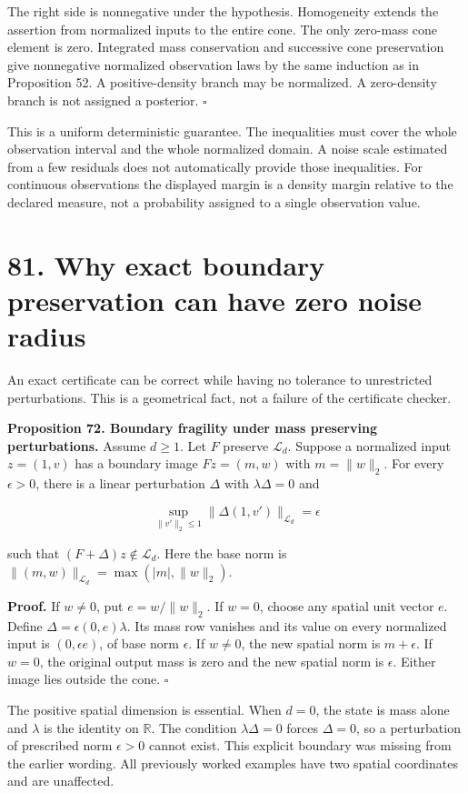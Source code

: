 \documentclass[11pt,letterpaper]{article}
\begin{document}
The right side is nonnegative under the hypothesis. Homogeneity extends
the assertion from normalized inputs to the entire cone. The only
zero-mass cone element is zero. Integrated mass conservation and
successive cone preservation give nonnegative normalized observation
laws by the same induction as in Proposition 52. A positive-density
branch may be normalized. A zero-density branch is not assigned a
posterior. \(\square\)

This is a uniform deterministic guarantee. The inequalities must cover
the whole observation interval and the whole normalized domain. A noise
scale estimated from a few residuals does not automatically provide
those inequalities. For continuous observations the displayed margin is
a density margin relative to the declared measure, not a probability
assigned to a single observation value.

\section{81. Why exact boundary preservation can have zero noise
radius}\label{why-exact-boundary-preservation-can-have-zero-noise-radius}

An exact certificate can be correct while having no tolerance to
unrestricted perturbations. This is a geometrical fact, not a failure of
the certificate checker.

\textbf{Proposition 72. Boundary fragility under mass preserving
perturbations.} Assume \(d\geq1\). Let \(F\) preserve \(\mathcal L_d\).
Suppose a normalized input \(z=(1,v)\) has a boundary image \(Fz=(m,w)\)
with \(m=\|w\|_2\). For every \(\epsilon>0\), there is a linear
perturbation \(\Delta\) with \(\lambda\Delta=0\) and

\[
\sup_{\|v'\|_2\leq1}\|\Delta(1,v')\|_{\mathcal L_d}=\epsilon
\]

such that \((F+\Delta)z\notin\mathcal L_d\). Here the base norm is
\(\|(m,w)\|_{\mathcal L_d}=\max(|m|,\|w\|_2)\).

\textbf{Proof.} If \(w\ne0\), put \(e=w/\|w\|_2\). If \(w=0\), choose
any spatial unit vector \(e\). Define \(\Delta=\epsilon(0,e)\lambda\).
Its mass row vanishes and its value on every normalized input is
\((0,\epsilon e)\), of base norm \(\epsilon\). If \(w\ne0\), the new
spatial norm is \(m+\epsilon\). If \(w=0\), the original output mass is
zero and the new spatial norm is \(\epsilon\). Either image lies outside
the cone. \(\square\)

The positive spatial dimension is essential. When \(d=0\), the state is
mass alone and \(\lambda\) is the identity on \(\mathbb R\). The
condition \(\lambda\Delta=0\) forces \(\Delta=0\), so a perturbation of
prescribed norm \(\epsilon>0\) cannot exist. This explicit boundary was
missing from the earlier wording. All previously worked examples have
two spatial coordinates and are unaffected.
\end{document}
